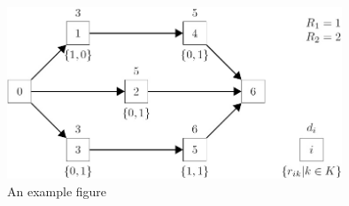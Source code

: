 \begin{figure}[h]
\begin{center}
\includegraphics[width=10cm]{images/example_figure}
\caption{An example figure}
\label{fig:example}
\end{center}
\end{figure}

